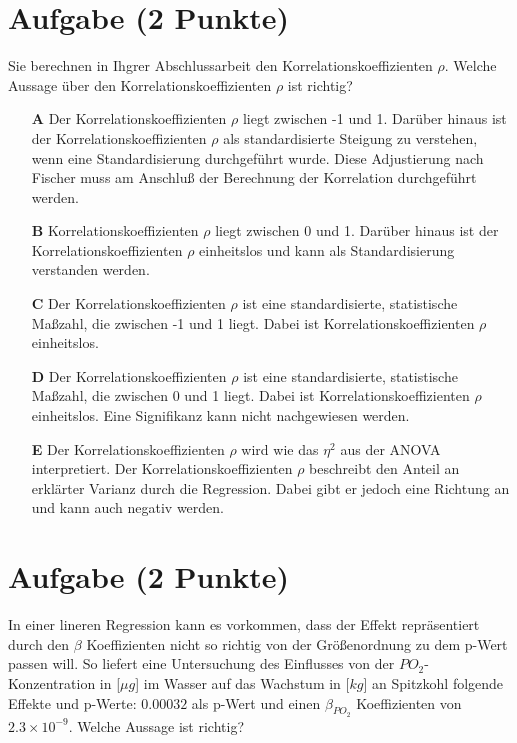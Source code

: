 \documentclass[a4paper, 9pt]{scrartcl}\usepackage[]{graphicx}\usepackage[]{xcolor}
\begin{document}
\section{Aufgabe \hfill (2 Punkte)}




Sie berechnen in Ihgrer Abschlussarbeit den Korrelationskoeffizienten $\rho$. Welche Aussage über den Korrelationskoeffizienten $\rho$ ist richtig?




\begin{enumerate}
\item [\textbf{A} \msquare] Der Korrelationskoeffizienten $\rho$ liegt zwischen -1 und 1. Darüber hinaus ist der Korrelationskoeffizienten $\rho$ als standardisierte Steigung zu verstehen, wenn eine Standardisierung durchgeführt wurde. Diese Adjustierung nach Fischer muss am Anschluß der Berechnung der Korrelation durchgeführt werden.
\item [\textbf{B} \msquare] Korrelationskoeffizienten $\rho$ liegt zwischen 0 und 1. Darüber hinaus ist der Korrelationskoeffizienten $\rho$ einheitslos und kann als Standardisierung verstanden werden.
\item [\textbf{C} \msquare] Der Korrelationskoeffizienten $\rho$ ist eine standardisierte, statistische Maßzahl, die zwischen -1 und 1 liegt. Dabei ist Korrelationskoeffizienten $\rho$ einheitslos.
\item [\textbf{D} \msquare] Der Korrelationskoeffizienten $\rho$ ist eine standardisierte, statistische Maßzahl, die zwischen 0 und 1 liegt. Dabei ist Korrelationskoeffizienten $\rho$ einheitslos. Eine Signifikanz kann nicht nachgewiesen werden.
\item [\textbf{E} \msquare] Der Korrelationskoeffizienten $\rho$ wird wie das $\eta^2$ aus der ANOVA interpretiert. Der Korrelationskoeffizienten $\rho$ beschreibt den Anteil an erklärter Varianz durch die Regression. Dabei gibt er jedoch eine Richtung an und kann auch negativ werden.
\end{enumerate}

\section{Aufgabe \hfill (2 Punkte)}



In einer lineren Regression kann es vorkommen, dass der Effekt repräsentiert durch den $\beta$ Koeffizienten nicht so richtig von der Größenordnung zu dem p-Wert passen will. So liefert eine Untersuchung des Einflusses von der $PO_2$-Konzentration in [$\mu g$] im Wasser auf das Wachstum in [$kg$] an Spitzkohl folgende Effekte und p-Werte: $0.00032$ als p-Wert und einen $\beta_{PO_2}$ Koeffizienten von $2.3\times 10^{-9}$. Welche Aussage ist richtig?
\end{document}
